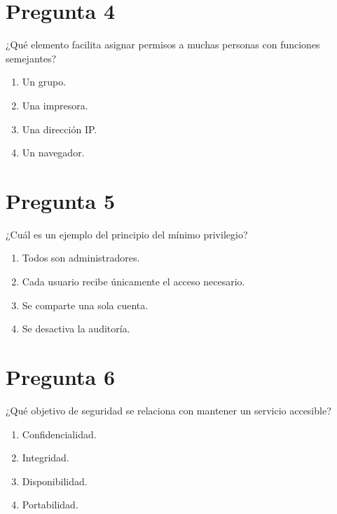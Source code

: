 \documentclass[
  spanish,
  letterpaper,
]{scrbook}
\providecommand{\tightlist}{%
  \setlength{\itemsep}{0pt}\setlength{\parskip}{0pt}}
\begin{document}
\section{Pregunta 4}\label{pregunta-4}

¿Qué elemento facilita asignar permisos a muchas personas con funciones
semejantes?

\begin{enumerate}
\def\labelenumi{\alph{enumi}.}
\tightlist
\item
  Un grupo.\\
\item
  Una impresora.\\
\item
  Una dirección IP.\\
\item
  Un navegador.
\end{enumerate}

\section{Pregunta 5}\label{pregunta-5}

¿Cuál es un ejemplo del principio del mínimo privilegio?

\begin{enumerate}
\def\labelenumi{\alph{enumi}.}
\tightlist
\item
  Todos son administradores.\\
\item
  Cada usuario recibe únicamente el acceso necesario.\\
\item
  Se comparte una sola cuenta.\\
\item
  Se desactiva la auditoría.
\end{enumerate}

\section{Pregunta 6}\label{pregunta-6}

¿Qué objetivo de seguridad se relaciona con mantener un servicio
accesible?

\begin{enumerate}
\def\labelenumi{\alph{enumi}.}
\tightlist
\item
  Confidencialidad.\\
\item
  Integridad.\\
\item
  Disponibilidad.\\
\item
  Portabilidad.
\end{enumerate}
\end{document}
